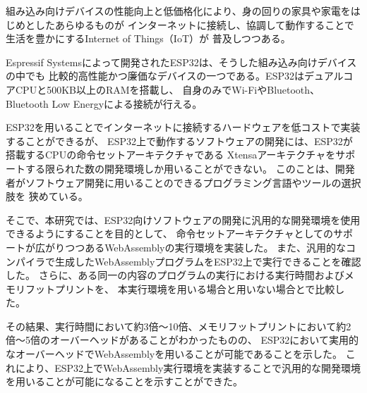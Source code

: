 \begin{jabstract}

組み込み向けデバイスの性能向上と低価格化により、身の回りの家具や家電をはじめとしたあらゆるものが
インターネットに接続し、協調して動作することで生活を豊かにするInternet of Things（IoT）が
普及しつつある。

Espressif Systemsによって開発されたESP32は、そうした組み込み向けデバイスの中でも
比較的高性能かつ廉価なデバイスの一つである。ESP32はデュアルコアCPUと500KB以上のRAMを搭載し、
自身のみでWi-FiやBluetooth、Bluetooth Low Energyによる接続が行える。

ESP32を用いることでインターネットに接続するハードウェアを低コストで実装することができるが、
ESP32上で動作するソフトウェアの開発には、ESP32が搭載するCPUの命令セットアーキテクチャである
Xtensaアーキテクチャをサポートする限られた数の開発環境しか用いることができない。
このことは、開発者がソフトウェア開発に用いることのできるプログラミング言語やツールの選択肢を
狭めている。

そこで、本研究では、ESP32向けソフトウェアの開発に汎用的な開発環境を使用できるようにすることを目的として、
命令セットアーキテクチャとしてのサポートが広がりつつあるWebAssemblyの実行環境を実装した。
また、汎用的なコンパイラで生成したWebAssemblyプログラムをESP32上で実行できることを確認した。
さらに、ある同一の内容のプログラムの実行における実行時間およびメモリフットプリントを、
本実行環境を用いる場合と用いない場合とで比較した。

その結果、実行時間において約3倍〜10倍、メモリフットプリントにおいて約2倍〜5倍のオーバーヘッドがあることがわかったものの、
ESP32において実用的なオーバーヘッドでWebAssemblyを用いることが可能であることを示した。
これにより、ESP32上でWebAssembly実行環境を実装することで汎用的な開発環境を用いることが可能になることを示すことができた。

\end{jabstract}
